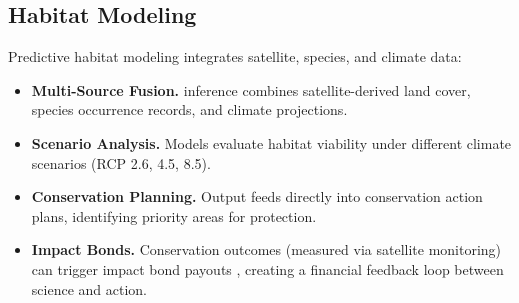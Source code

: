\subsection{Habitat Modeling}

Predictive habitat modeling integrates satellite, species, and climate data:

\begin{itemize}
    \item \textbf{Multi-Source Fusion.} \AChain{} inference combines satellite-derived land cover, species occurrence records, and climate projections.
    \item \textbf{Scenario Analysis.} Models evaluate habitat viability under different climate scenarios (RCP 2.6, 4.5, 8.5).
    \item \textbf{Conservation Planning.} Output feeds directly into conservation action plans, identifying priority areas for protection.
    \item \textbf{Impact Bonds.} Conservation outcomes (measured via satellite monitoring) can trigger \Zoo{} impact bond payouts \cite{zoo-impact-bonds}, creating a financial feedback loop between science and action.
\end{itemize}


